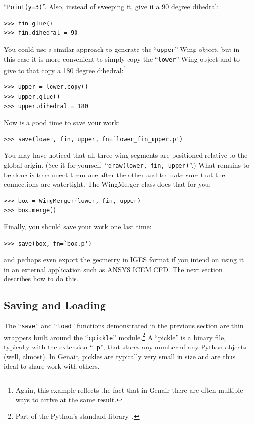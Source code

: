 \documentclass[]{article}
\begin{document}
``\texttt{Point(y=3)}''.  Also, instead of sweeping it, give it a 90 
degree dihedral:
\begin{verbatim}
>>> fin.glue()
>>> fin.dihedral = 90
\end{verbatim}
You could use a similar approach to generate the ``\texttt{upper}'' Wing 
object, but in this case it is more convenient to simply copy the 
``\texttt{lower}'' Wing object and to give to that copy a 180 degree 
dihedral:\footnote{Again, this example reflects the fact that in Genair 
there are often multiple ways to arrive at the same result.}
\begin{verbatim}
>>> upper = lower.copy()
>>> upper.glue()
>>> upper.dihedral = 180
\end{verbatim}
Now is a good time to save your work:
\begin{verbatim}
>>> save(lower, fin, upper, fn=`lower_fin_upper.p')
\end{verbatim}

You may have noticed that all three wing segments are positioned 
relative to the global origin.  (See it for yourself: 
``\texttt{draw(lower, fin, upper)}''.)  What remains to be done is to 
connect them one after the other and to make sure that the connections 
are watertight.  The WingMerger class does that for you:
\begin{verbatim}
>>> box = WingMerger(lower, fin, upper)
>>> box.merge()
\end{verbatim}

Finally, you should save your work one last time:
\begin{verbatim}
>>> save(box, fn=`box.p')
\end{verbatim}
and perhaps even export the geometry in IGES format if you intend on 
using it in an external application such as ANSYS ICEM CFD.  The next 
section describes how to do this.

\subsection{Saving and Loading}
\label{subsec:ft}

The ``\texttt{save}'' and ``\texttt{load}'' functions demonstrated in 
the previous section are thin wrappers built around the 
``\texttt{cpickle}'' module.\footnote{Part of the Python's standard 
library~\cite{python}.}  A ``pickle'' is a binary file, typically with 
the extension ``\texttt{.p}'', that stores any number of any Python 
objects (well, almost).  In Genair, pickles are typically very small in 
size and are thus ideal to share work with others.
\end{document}
